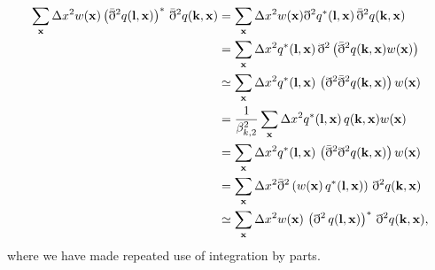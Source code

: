 \documentclass[a4paper,11pt]{article}
\newcommand{\summ}[1]{\sum_{\bf #1}\Delta #1^2}
\begin{document}
      \begin{align}
        \summ{x}w({\bf x})\left(\bar{\eth}^2q({\bf l},{\bf x})\right)^*\,\bar{\eth}^2q({\bf k},{\bf x})
        &=\summ{x}w({\bf x})\eth^2 q^*({\bf l},{\bf x})\,\bar{\eth}^2q({\bf k},{\bf x})\\
        &=\summ{x}q^*({\bf l},{\bf x})\,\eth^2\left(\bar{\eth}^2q({\bf k},{\bf x})w({\bf x})\right)\\
        &\simeq\summ{x}q^*({\bf l},{\bf x})\,\left(\eth^2\bar{\eth}^2q({\bf k},{\bf x})\right)w({\bf x})\\
        &=\frac{1}{\beta^2_{k,2}}\summ{x}q^*({\bf l},{\bf x})\,q({\bf k},{\bf x})w({\bf x})\\
        &=\summ{x}q^*({\bf l},{\bf x})\,\left(\bar{\eth}^2\eth^2q({\bf k},{\bf x})\right)w({\bf x})\\
        &=\summ{x}\bar{\eth}^2\left(w({\bf x})\,q^*({\bf l},{\bf x})\right)\,\eth^2q({\bf k},{\bf x})\\
        &\simeq\summ{x}w({\bf x})\,\left(\eth^2\,q({\bf l},{\bf x})\right)^*\,\eth^2q({\bf k},{\bf x}),
      \end{align}
      where we have made repeated use of integration by parts.
    
\end{document}
